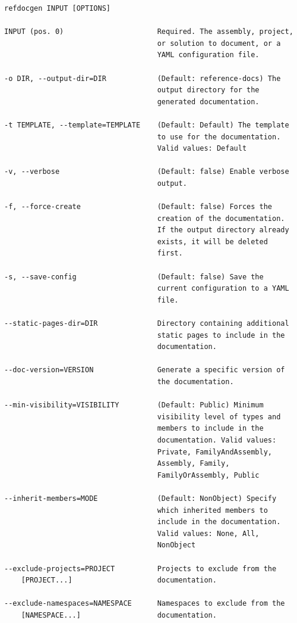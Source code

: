 \begin{listing}[H]
\begin{lstlisting}[language=HTML]
refdocgen INPUT [OPTIONS]

INPUT (pos. 0)                      Required. The assembly, project,
                                    or solution to document, or a
                                    YAML configuration file.

-o DIR, --output-dir=DIR            (Default: reference-docs) The
                                    output directory for the
                                    generated documentation.

-t TEMPLATE, --template=TEMPLATE    (Default: Default) The template
                                    to use for the documentation.
                                    Valid values: Default

-v, --verbose                       (Default: false) Enable verbose
                                    output.

-f, --force-create                  (Default: false) Forces the
                                    creation of the documentation.
                                    If the output directory already
                                    exists, it will be deleted
                                    first.

-s, --save-config                   (Default: false) Save the
                                    current configuration to a YAML
                                    file.

--static-pages-dir=DIR              Directory containing additional
                                    static pages to include in the
                                    documentation.

--doc-version=VERSION               Generate a specific version of
                                    the documentation.

--min-visibility=VISIBILITY         (Default: Public) Minimum
                                    visibility level of types and
                                    members to include in the
                                    documentation. Valid values:
                                    Private, FamilyAndAssembly,
                                    Assembly, Family,
                                    FamilyOrAssembly, Public

--inherit-members=MODE              (Default: NonObject) Specify
                                    which inherited members to
                                    include in the documentation.
                                    Valid values: None, All,
                                    NonObject

--exclude-projects=PROJECT          Projects to exclude from the
    [PROJECT...]                    documentation.

--exclude-namespaces=NAMESPACE      Namespaces to exclude from the
    [NAMESPACE...]                  documentation.
\end{lstlisting}
\caption{\texttt{refdocgen} -- command line reference}
\label{lst:cmd-line-reference}
\end{listing}

